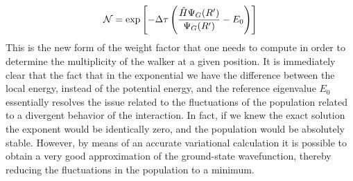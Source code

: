 \begin{equation}
{\cal N}= \exp\left[-\Delta\tau\left(\frac{\hat{H}\Psi_G(R')}{\Psi_G(R')}-E_0\right)\right]
\end{equation}
This is the new form of the weight factor that one needs to compute in order to determine the multiplicity of the walker at a given position. It is immediately clear that the fact that in the exponential we have the difference between the local energy, instead of the potential energy, and the reference eigenvalue $E_0$ essentially resolves the issue related to the fluctuations of the population related to a divergent behavior of the interaction. In fact, if we knew the exact solution the exponent would be identically zero, and the population would be absolutely stable. However, by means of an accurate variational calculation it is possible to obtain a very good approximation of the ground-state wavefunction, thereby reducing the fluctuations in the population to a minimum. 

